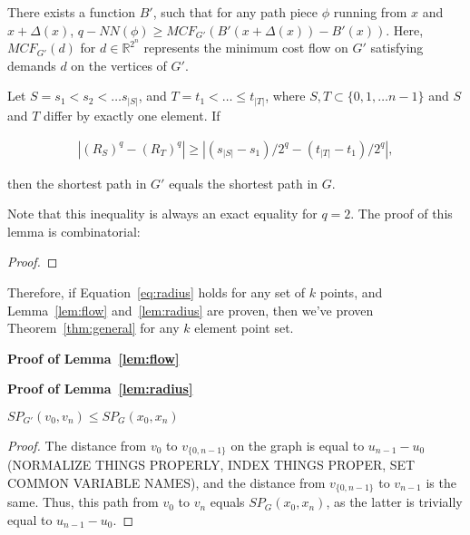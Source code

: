 
\begin{lemma}\label{lem:flow}There exists a function $B'$, such that for any
path piece $\phi$ running from $x$ and $x+\Delta(x)$, $q-NN(\phi) \geq
MCF_{G'}(B'(x+\Delta(x))-B'(x))$. Here, $MCF_{G'}(d)$ for $d \in
\mathbb{R}^{2^n}$ represents the minimum cost flow on $G'$ satisfying demands
$d$ on the vertices of $G'$.

\end{lemma}

\begin{lemma}\label{lem:radius} Let $S = s_1 < s_2 < \ldots s_{|S|}$, and $T =
t_1 < \ldots \leq t_{|T|}$, where $S, T \subset \{0,1,\ldots n-1\}$ and $S$ and
$T$ differ by exactly one element. If

\begin{align}\label{eq:radius} |(R_{S})^q-(R_{T})^q| \geq
|(s_{|S|}-s_1)/2^q-(t_{|T|}-t_1)/2^q|, \end{align}

then the shortest path in $G'$ equals the shortest path in $G$.

\end{lemma}

Note that this inequality is always an exact equality for $q=2$. The proof of
this lemma is combinatorial:

\begin{proof}

\end{proof}

Therefore, if Equation~\ref{eq:radius} holds for any set of $k$ points, and
Lemma~\ref{lem:flow} and~\ref{lem:radius} are proven, then we've proven
Theorem~\ref{thm:general} for any $k$ element point set.

\textbf{Proof of Lemma~\ref{lem:flow}}

\textbf{Proof of Lemma~\ref{lem:radius}}

\begin{lemma} $SP_{G'}(v_0, v_n) \leq SP_G(x_0, x_n)$

\end{lemma}

\begin{proof}

The distance from $v_0$ to $v_{\{0,n-1\}}$ on the graph is equal to
$u_{n-1}-u_0$ (NORMALIZE THINGS PROPERLY, INDEX THINGS PROPER, SET COMMON
VARIABLE NAMES), and the distance from $v_{\{0, n-1\}}$ to $v_{n-1}$ is the
same. Thus, this path from $v_0$ to $v_n$ equals $SP_G(x_0, x_n)$, as the
latter is trivially equal to $u_{n-1} - u_0$.

\end{proof}

